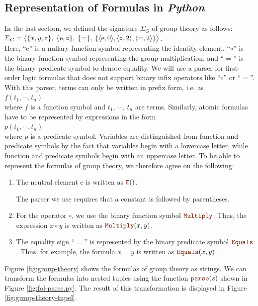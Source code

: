 \subsection{Representation of Formulas in \textsl{Python}}
In the last section, we defined the signature $\Sigma_G$ of
group theory as follows:
\\[0.2cm]
\hspace*{1.3cm}
$\Sigma_G = 
   \bigl\langle \{x,y,z\},\; \{\mathrm{e},\circ\},\; \{=\},\; \{ \pair(\mathrm{e},0), \pair(\circ,2), \pair(=,2) \} \bigr\rangle 
$.
\\[0.2cm]
Here, ``$\mathrm{e}$'' is a nullary function symbol representing the identity element, ``$\circ$'' is
the binary function symbol representing the group multiplication, and ``$=$'' is the binary predicate symbol to 
denote equality. 
We will use a parser for first-order logic formulas that does not support binary infix operators like
``$\circ$'' or ``$=$''. With this parser, terms can only be written in prefix form, i.e. as
\\[0.2cm]
\hspace*{1.3cm}
$f(t_1,\cdots,t_n)$
\\[0.2cm]
where $f$ is a function symbol and $t_1$, $\cdots$, $t_n$ are terms. Similarly, atomic formulas have to be
represented by expressions in the form 
\\[0.2cm]
\hspace*{1.3cm}
$p(t_1,\cdots,t_n)$
\\[0.2cm]
where $p$ is a predicate symbol.  Variables are distinguished from function and predicate symbols
by the fact that variables begin with a lowercase letter, while function and
predicate symbols begin with an uppercase letter. To be able to represent the formulas of group theory, we
therefore agree on the following: 
\begin{enumerate}
\item The neutral element $\mathrm{e}$ is written as $\mytt{E}()$.

      The parser we use requires that  a constant is followed by parentheses.
\item For the operator $\circ$, we use the binary function symbol $\mytt{Multiply}$.
      Thus, the expression $x \circ y$ is written as $\mytt{Multiply}(x, y)$.
\item The equality sign ``$=$'' is represented by the binary predicate symbol
      $\mytt{Equals}$. Thus, for example, the formula $x = y$ is written as $\mytt{Equals}(x, y)$.
\end{enumerate}
Figure \ref{fig:group-theory} shows the formulas of group theory as strings.
We can transform the formulas into nested tuples using the function $\mytt{parse}(s)$ shown in Figure
\ref{fig:fol-parse.py}. The result of this transformation is displayed in Figure \ref{fig:group-theory-tupel}. 


